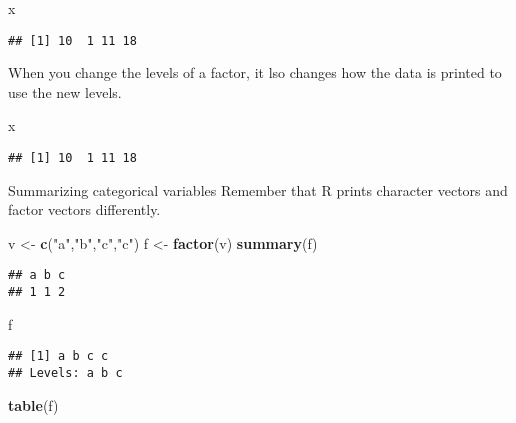\documentclass[
]{article}
\newenvironment{Shaded}{\begin{snugshade}}{\end{snugshade}}
\newcommand{\KeywordTok}[1]{\textcolor[rgb]{0.13,0.29,0.53}{\textbf{#1}}}
\newcommand{\NormalTok}[1]{#1}
\newcommand{\StringTok}[1]{\textcolor[rgb]{0.31,0.60,0.02}{#1}}
\begin{document}
\begin{Shaded}
\begin{Highlighting}[]
\NormalTok{x}
\end{Highlighting}
\end{Shaded}

\begin{verbatim}
## [1] 10  1 11 18
\end{verbatim}

When you change the levels of a factor, it lso changes how the data is
printed to use the new levels.

\begin{Shaded}
\begin{Highlighting}[]
\NormalTok{x}
\end{Highlighting}
\end{Shaded}

\begin{verbatim}
## [1] 10  1 11 18
\end{verbatim}

Summarizing categorical variables Remember that R prints character
vectors and factor vectors differently.

\begin{Shaded}
\begin{Highlighting}[]
\NormalTok{v <-}\StringTok{ }\KeywordTok{c}\NormalTok{(}\StringTok{"a"}\NormalTok{,}\StringTok{"b"}\NormalTok{,}\StringTok{"c"}\NormalTok{,}\StringTok{"c"}\NormalTok{)}
\NormalTok{f <-}\StringTok{ }\KeywordTok{factor}\NormalTok{(v)}
\KeywordTok{summary}\NormalTok{(f)}
\end{Highlighting}
\end{Shaded}

\begin{verbatim}
## a b c 
## 1 1 2
\end{verbatim}

\begin{Shaded}
\begin{Highlighting}[]
\NormalTok{f}
\end{Highlighting}
\end{Shaded}

\begin{verbatim}
## [1] a b c c
## Levels: a b c
\end{verbatim}

\begin{Shaded}
\begin{Highlighting}[]
\KeywordTok{table}\NormalTok{(f)}
\end{Highlighting}
\end{Shaded}
\end{document}

